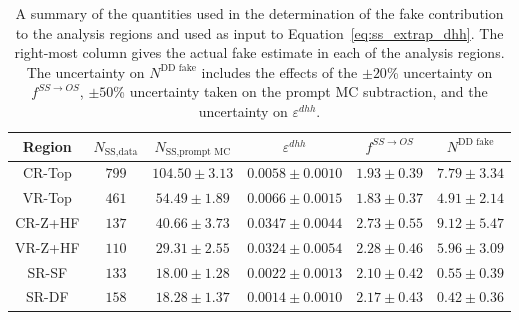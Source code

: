\begin{table}[!htb]
    \begin{center}
    \caption{
        A summary of the quantities used in the determination of the fake contribution to the
        analysis regions and used as input to Equation~\ref{eq:ss_extrap_dhh}. The right-most
        column gives the actual fake estimate in each of the analysis regions. The uncertainty
        on $N^{\text{DD fake}}$ includes the effects of the $\pm20$\% uncertainty on
        $f^{SS \rightarrow OS}$, $\pm50$\% uncertainty taken on the prompt MC subtraction, and the
        uncertainty on $\varepsilon^{dhh}$.
    }
    \label{tab:hh_fake_quant}
    \begin{tabular}{c | c c c c || c}
    \hline
    \textbf{Region} & \textbf{$N_{\text{SS,data}}$} & \textbf{$N_{\text{SS,prompt MC}}$} & \textbf{$\varepsilon^{dhh}$} & \textbf{$f^{SS \rightarrow OS}$} & \textbf{$N^{\text{DD fake}} $} \\
    \hline
    CR-Top  & $799$ & $104.50 \pm 3.13$ & $ 0.0058 \pm 0.0010$ & $1.93 \pm 0.39$   & $7.79 \pm 3.34$ \\
    VR-Top  & $461$ & $54.49 \pm 1.89$  & $ 0.0066 \pm 0.0015$ & $1.83 \pm 0.37$   &  $4.91 \pm 2.14$ \\
    CR-Z+HF & $137$ & $40.66 \pm 3.73$  & $ 0.0347 \pm 0.0044$ & $2.73 \pm 0.55$   & $9.12 \pm 5.47$ \\
    VR-Z+HF & $110$ & $29.31 \pm 2.55$  & $ 0.0324 \pm 0.0054$ & $2.28 \pm 0.46$   &  $5.96 \pm 3.09$\\
    \hdashline
    SR-SF   & $133$ & $18.00 \pm 1.28$  & $ 0.0022 \pm 0.0013 $ & $2.10 \pm 0.42$  &  $0.55 \pm 0.39$\\
    SR-DF   & $158$ & $18.28 \pm 1.37$  & $ 0.0014 \pm 0.0010 $ &  $2.17 \pm 0.43$ &  $0.42 \pm 0.36$\\
    \hline
    \end{tabular}
    \end{center}
\end{table}

